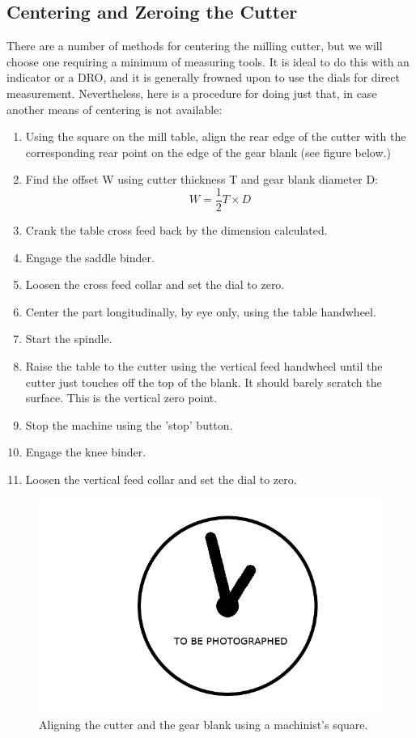\documentclass[12pt,twoside,letterpaper]{article}
\begin{document}
\subsection{Centering and Zeroing the Cutter}
	There are a number of methods for centering the milling cutter, but we will choose one requiring a minimum of measuring tools. It is ideal to do this with an indicator or a DRO, and it is generally frowned upon to use the dials for direct measurement. Nevertheless, here is a procedure for doing just that, in case another means of centering is not available:

\begin{enumerate}
\item Using the square on the mill table, align the rear edge of the cutter with the corresponding rear point on the edge of the gear blank (see figure below.) 
\item Find the offset W using cutter thickness T and gear blank diameter D: \[ W = \frac{1}{2} T \times D\]
\item Crank the table cross feed back by the dimension calculated.
\item Engage the saddle binder.
\item Loosen the cross feed collar and set the dial to zero. 
\item Center the part longitudinally, by eye only, using the table handwheel.
\item Start the spindle.
\item Raise the table to the cutter using the vertical feed handwheel until the cutter just touches off the top of the blank. It should barely scratch the surface. This is the vertical zero point.
\item Stop the machine using the 'stop' button.
\item Engage the knee binder.
\item Loosen the vertical feed collar and set the dial to zero. 

\end{enumerate}

\begin{figure}[H]
\centering
\includegraphics[width=5in]{imgpending}
	\caption{Aligning the cutter and the gear blank using a machinist's square.}
\end{figure}
\end{document}
